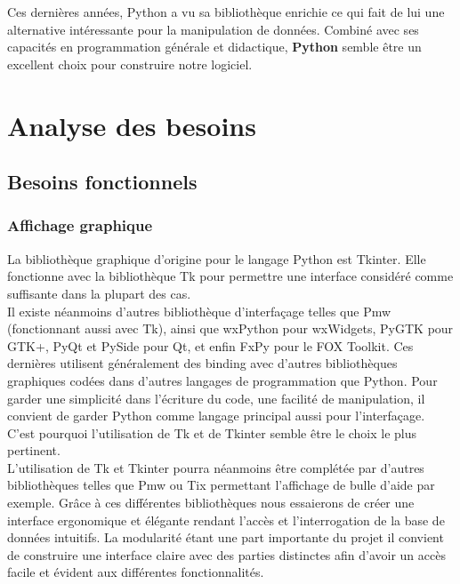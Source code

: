 \documentclass[a4paper]{report}
\begin{document}
Ces dernières années, Python a vu sa bibliothèque enrichie ce qui fait de lui une alternative intéressante pour la manipulation de données. Combiné avec ses capacités en programmation générale et didactique, \textbf{Python} semble être un excellent choix pour construire notre logiciel.
    

\section{Analyse des besoins}

\subsection{Besoins fonctionnels}


\subsubsection{Affichage graphique}

La bibliothèque graphique d'origine pour le langage Python est Tkinter\cite{ref7}. Elle fonctionne avec la bibliothèque Tk\cite{ref8} pour permettre une interface considéré comme suffisante dans la plupart des cas. \\

Il existe néanmoins d'autres bibliothèque d'interfaçage telles que Pmw\cite{ref9} (fonctionnant aussi avec Tk), ainsi que  wxPython\cite{ref10} pour wxWidgets\cite{ref11}, PyGTK\cite{ref12} pour GTK+\cite{ref13}, PyQt\cite{ref14} et PySide\cite{ref15} pour Qt\cite{ref16}, et enfin FxPy\cite{ref17} pour le FOX Toolkit\cite{ref18}. Ces dernières utilisent généralement des binding avec d'autres bibliothèques graphiques codées dans d'autres langages de programmation que Python. Pour garder une simplicité dans l'écriture du code, une facilité de manipulation, il convient de garder Python comme langage principal aussi pour l'interfaçage. C'est pourquoi l'utilisation de Tk et de Tkinter semble être le choix le plus pertinent. \\

L'utilisation de Tk et Tkinter pourra néanmoins être complétée par d'autres bibliothèques telles que Pmw ou Tix\cite{ref19} permettant l'affichage de bulle d'aide par exemple. Grâce à ces différentes bibliothèques nous essaierons de créer une interface ergonomique et élégante rendant l'accès et l'interrogation de la base de données intuitifs. La modularité étant une part importante du projet il convient de construire une interface claire avec des parties distinctes afin d'avoir un accès facile et évident aux différentes fonctionnalités.
\end{document}
